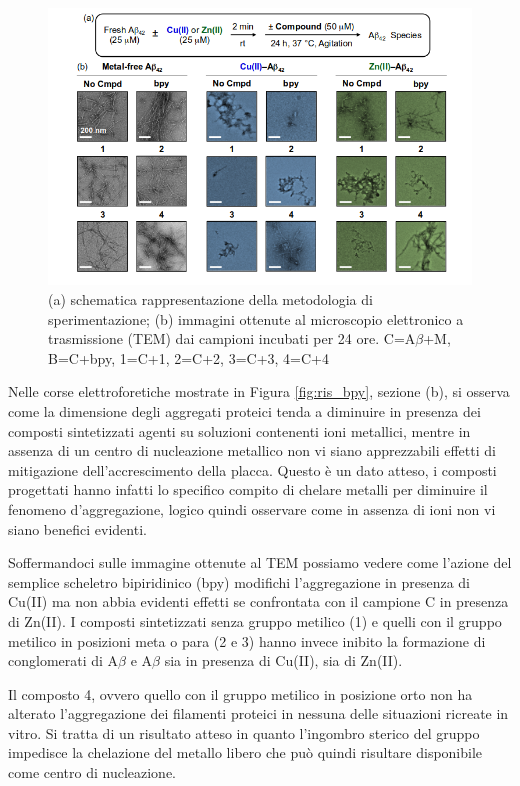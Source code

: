 \documentclass[a4paper, 12pt]{article}
\begin{document}
\begin{figure}[H]
	\centering
	\includegraphics[width=\linewidth]{immagini/ris_bpy2.png}
	\caption{(a) schematica rappresentazione della metodologia di sperimentazione; (b) immagini ottenute al microscopio elettronico a trasmissione (TEM) dai campioni incubati per 24 ore. C=A\(\beta\)+M, B=C+bpy, 1=C+1, 2=C+2, 3=C+3, 4=C+4 }
	\label{fig:ris_bpy2}
\end{figure}

Nelle corse elettroforetiche mostrate in Figura \ref{fig:ris_bpy}, sezione (b), si osserva come la dimensione degli aggregati proteici tenda a diminuire in presenza dei composti sintetizzati agenti su soluzioni contenenti ioni metallici, mentre in assenza di un centro di nucleazione metallico non vi siano apprezzabili effetti di mitigazione dell'accrescimento della placca. Questo è un dato atteso, i composti progettati hanno infatti lo specifico compito di chelare metalli per diminuire il fenomeno d'aggregazione, logico quindi osservare come in assenza di ioni non vi siano benefici evidenti.

Soffermandoci sulle immagine ottenute al TEM possiamo vedere come l'azione del semplice scheletro bipiridinico (bpy) modifichi l'aggregazione in presenza di Cu(II) ma non abbia evidenti effetti se confrontata con il campione C in presenza di Zn(II). I composti sintetizzati senza gruppo metilico (1) e quelli con il gruppo metilico in posizioni meta o para (2 e 3) hanno invece inibito la formazione di conglomerati di A\(\beta\) e A\(\beta\) sia in presenza di Cu(II), sia di Zn(II).

Il composto 4, ovvero quello con il gruppo metilico in posizione orto non ha alterato l’aggregazione dei filamenti proteici in nessuna delle situazioni ricreate in vitro. Si tratta di un risultato atteso in quanto l’ingombro sterico del gruppo  impedisce la chelazione del metallo libero che può quindi risultare disponibile come centro di nucleazione.
\end{document}

